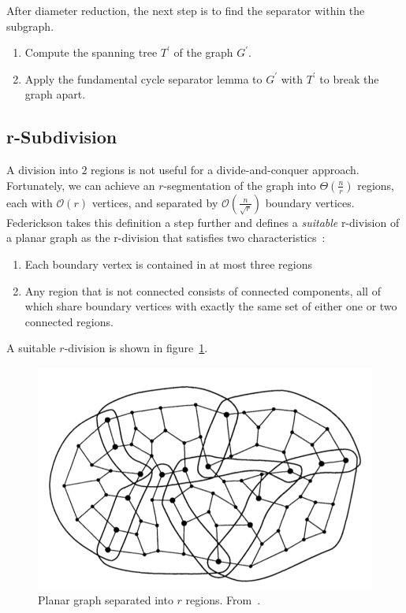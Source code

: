 \documentclass[12pt]{article}
\begin{document}
    After diameter reduction, the next step is to find the separator within the subgraph.
    \begin{enumerate}
      \item Compute the spanning tree $T^{'}$ of the graph $G^{'}$.

      \item Apply the fundamental cycle separator lemma to $G^{'}$ with $T^{'}$ to break the graph apart.
    \end{enumerate}

    \subsection{r-Subdivision}
    \label{sec:graph-sep-rsub}

    A division into $2$ regions is not useful for a divide-and-conquer approach. Fortunately, we can achieve an $r$-segmentation of the graph into $\Theta \left (\frac{n}{r} \right )$ regions, each with $\mathcal{O}(r)$ vertices, and separated by $\mathcal{O} \left (\frac{n}{\sqrt{r}} \right )$ boundary vertices. Federickson takes this definition a step further and defines a \textit{suitable} r-division of a planar graph as the r-division that satisfies two characteristics~\cite{federickson1987fast}:
    \begin{enumerate}
        \item Each boundary vertex is contained in at most three regions

        \item Any region that is not connected consists of connected components, all of which share boundary vertices with exactly the same set of either one or two connected regions.
    \end{enumerate}
A suitable $r$-division is shown in figure~\ref{fig:rsep}.

    \begin{figure}[!htb]
      \centering
      \includegraphics[width=.5\textwidth]{rsep}
      \caption{Planar graph separated into $r$ regions. From~\cite{federickson1987fast}.}
      \label{fig:rsep}
    \end{figure}
\end{document}
